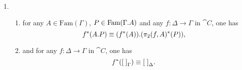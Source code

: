 \begin{defn}
\begin{enumerate}
\begin{enumerate}
\end{enumerate}
\item 
\begin{enumerate}
\item for any $A\in\mathrm{Fam}(\Gamma)$, $P\in\mathrm{Fam}(\ctxext{\Gamma}{A})$
and any $f:\Delta\to\Gamma$ in $\cat{C}$, one has
\begin{equation*}
f^\ast(\ctxext{A}{P})\jdeq \ctxext{(f^\ast(A))}{(\pi_2(f,A)^\ast(P))},
\end{equation*}
\item and for any $f:\Delta\to\Gamma$ in $\cat{C}$, one has
\begin{equation*}
f^\ast({[\;]}_{\Gamma})\equiv{[\;]}_{\Delta}.
\end{equation*}
\end{enumerate}
\end{enumerate} 
\end{defn}

\begin{comment}
\begin{defn}
Consider a functor $p:\cat{E}\to\cat{B}$, and let $\phi:e\to e'$ be a morphism in $\cat{E}$. We say that $\phi$ is \define{cocartesian} if for any morphism $\psi:e\to e''$ and any $g:p(e')\to p(e'')$ such that $g\circ p(\phi)=p(\psi)$, there is a unique morphism $h:e'\to e''$ such that $h\circ\phi=\psi$.

A \define{cocartesian lift} at $e$ of a morphism $\pi:p(e)\to b'$ in $\cat{B}$ is a cocartesian morphism $\phi:e\to e'$ for which $p(\phi)=\pi$.
\end{defn}
\end{comment}

